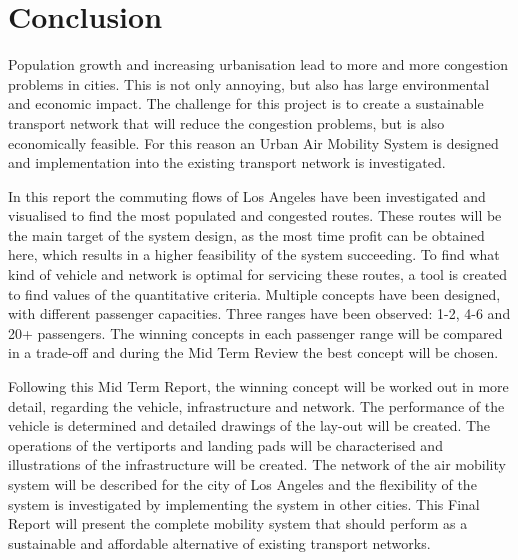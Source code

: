 \newpage
\chapter{Conclusion}
\label{Conclusion}

Population growth and increasing urbanisation lead to more and more congestion problems in cities. This is not only annoying, but also has large environmental and economic impact. The challenge for this project is to create a sustainable transport network that will reduce the congestion problems, but is also economically feasible. For this reason an Urban Air Mobility System is designed and implementation into the existing transport network is investigated. 

In this report the commuting flows of Los Angeles have been investigated and visualised to find the most populated and congested routes. These routes will be the main target of the system design, as the most time profit can be obtained here, which results in a higher feasibility of the system succeeding. To find what kind of vehicle and network is optimal for servicing these routes, a tool is created to find values of the quantitative criteria. Multiple concepts have been designed, with different passenger capacities. Three ranges have been observed: 1-2, 4-6 and 20+ passengers. The winning concepts in each passenger range will be compared in a trade-off and during the Mid Term Review the best concept will be chosen. 

Following this Mid Term Report, the winning concept will be worked out in more detail, regarding the vehicle, infrastructure and network. The performance of the vehicle is determined and detailed drawings of the lay-out will be created. The operations of the vertiports and landing pads will be characterised and illustrations of the infrastructure will be created. The network of the air mobility system will be described for the city of Los Angeles and the flexibility of the system is investigated by implementing the system in other cities. This Final Report will present the complete mobility system that should perform as a sustainable and affordable alternative of existing transport networks. 